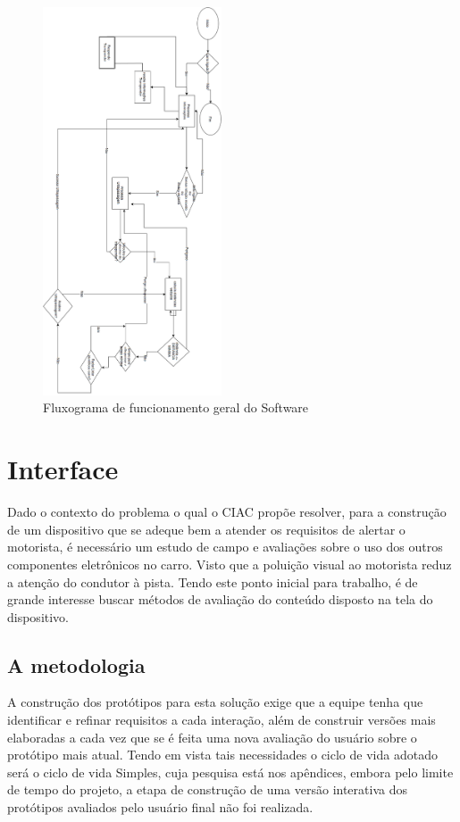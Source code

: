 \begin{figure}[h!]
  \centering
  \includegraphics[width=200px, scale=1, angle=90]{figuras/func_soft}
  \caption{Fluxograma de funcionamento geral do Software}
\label{fig:func_soft}
\end{figure}

\section {Interface}

Dado o contexto do problema o qual o CIAC propõe resolver, para a construção de um dispositivo que se adeque bem a atender os requisitos de alertar o motorista, é necessário um estudo de campo e avaliações sobre o uso dos outros componentes eletrônicos no carro. Visto que a poluição visual ao motorista reduz a atenção do condutor à pista. Tendo este ponto inicial para trabalho, é de grande interesse buscar métodos de avaliação do conteúdo disposto na tela do dispositivo.

\subsection{A metodologia}

A construção dos protótipos para esta solução exige que a equipe tenha que identificar e refinar requisitos a cada interação, além de construir versões mais elaboradas a cada vez que se é feita uma nova avaliação do usuário sobre o protótipo mais atual. Tendo em vista tais necessidades o ciclo de vida adotado será o ciclo de vida Simples, cuja pesquisa está nos apêndices, embora pelo limite de tempo do projeto, a etapa de construção de uma versão interativa dos protótipos avaliados pelo usuário final não foi realizada.

